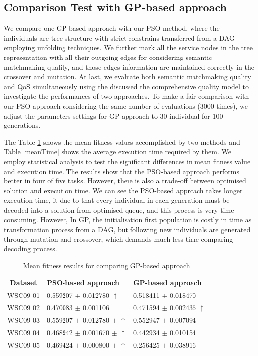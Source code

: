 \documentclass{IEEEtran}
\begin{document}
\subsection{Comparison Test with GP-based approach}\label{comparisonTestWithGP}
We compare one GP-based approach  \cite{ma2015hybrid} with our PSO method, where the individuals are tree structure with strict constrains transferred from a DAG employing unfolding techniques. We further mark all the service nodes in the tree representation with all their outgoing edges for considering semantic matchmaking quality, and those edges information are maintained correctly in the crossover and mutation. At last, we evaluate both semantic matchmaking quality and QoS simultaneously using the discussed the comprehensive quality model to investigate the performances of two approaches. To make a fair comparison with our PSO approach considering the same number of evaluations (3000 times), we adjust the parameters settings for GP approach \cite{ma2015hybrid} to 30 individual for 100 generations.

The Table \ref{meanFitness} shows the mean fitness values accomplished by two methods and Table \ref{meanTime} shows the average execution time required by them. We employ statistical analysis to test the significant differences in mean fitness value and execution time.  The results show that the PSO-based approach performs better in four of five tasks. However, there is also a trade-off between optimised solution and execution time. We can see the PSO-based approach takes longer execution time, it due to that every individual in each generation must be decoded into a solution from optimised queue, and this process is very time-consuming. However, In GP, the initialisation first population is costly in time as transformation process from a DAG, but following new individuals are generated through mutation and crossover, which demands much less time comparing decoding process.

\begin{table}[]
\centering
\caption{Mean fitness results for comparing GP-based approach}
\label{meanFitness}
\begin{tabular}{l|l|l}
\hline
\multicolumn{1}{c|}{Dataset} & PSO-based approach & GP-based approach  \\ \hline
WSC09 01                     &0.559207 $\pm$ 0.012780 $\uparrow$      &0.518411 $\pm$ 0.018470               \\ \hline
WSC09 02                     &0.470083 $\pm$  0.001106   &0.471594 $\pm$  0.002436 $\uparrow$           \\ \hline
WSC09 03                     & 0.559207 $\pm$ 0.012780 $\pm$ $\uparrow$  &0.552947 $\pm$ 0.007094            \\ \hline
WSC09 04                     & 0.468942 $\pm$ 0.001670 $\pm$ $\uparrow$  &0.442934 $\pm$ 0.010154            \\ \hline
WSC09 05                     & 0.469424 $\pm$ 0.000800 $\pm$ $\uparrow$  &0.256425 $\pm$ 0.038916            \\ \hline
\end{tabular}
\end{table}
\end{document}

